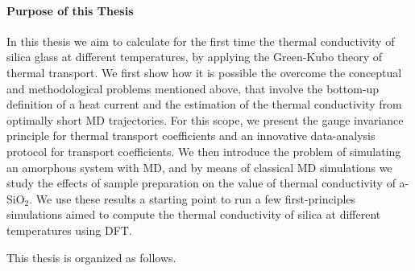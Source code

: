 \medskip

\paragraph{Purpose of this Thesis}
In this thesis we aim to calculate for the first time the thermal conductivity of silica glass at different temperatures, by applying the \abinitio Green-Kubo theory of thermal transport. 
We first show how it is possible the overcome the conceptual and methodological problems mentioned above, that involve the bottom-up definition of a heat current and the estimation of the thermal conductivity from optimally short MD trajectories. 
For this scope, we present the gauge invariance principle for thermal transport coefficients and an innovative data-analysis protocol for transport coefficients. 
We then introduce the problem of simulating an amorphous system with MD, and by means of classical MD simulations we study the effects of sample preparation on the value of thermal conductivity of a-SiO$_2$. 
We use these results a starting point to run a few first-principles simulations aimed to compute the thermal conductivity of silica at different temperatures using DFT. 


\medskip
This thesis is organized as follows. 

